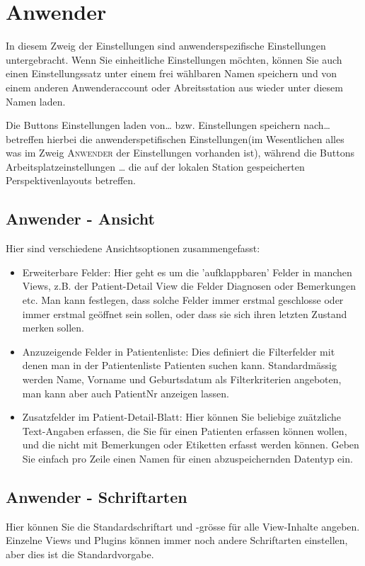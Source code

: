 \section{Anwender}
In diesem Zweig der Einstellungen sind anwenderspezifische Einstellungen
untergebracht. Wenn Sie einheitliche Einstellungen möchten, können Sie auch einen
Einstellungssatz unter einem frei wählbaren Namen speichern und von einem
anderen Anwenderaccount oder Abreitsstation aus wieder unter diesem Namen laden.

Die Buttons \glqq Einstellungen laden von\ldots\grqq{} bzw. \glqq Einstellungen
speichern nach\ldots\grqq{} betreffen hierbei die anwenderspetifischen
Einstellungen(im Wesentlichen alles was im Zweig \textsc{Anwender} der
Einstellungen vorhanden ist), während die Buttons \glqq
Arbeitsplatzeinstellungen \ldots\grqq{} die auf der lokalen Station
gespeicherten Perspektivenlayouts betreffen.
\subsection{Anwender - Ansicht}
\label{userconfig}
Hier sind verschiedene Ansichtsoptionen zusammengefasst:
\begin{itemize}
\item Erweiterbare Felder: Hier geht es um die 'aufklappbaren' Felder in manchen Views, z.B. der Patient-Detail View die Felder Diagnosen oder Bemerkungen etc. Man kann festlegen, dass solche Felder immer erstmal geschlosse oder immer erstmal geöffnet sein sollen, oder dass sie sich ihren letzten Zustand merken sollen.
\item Anzuzeigende Felder in Patientenliste: Dies definiert die Filterfelder mit denen man in der Patientenliste Patienten suchen kann. Standardmässig werden Name, Vorname und Geburtsdatum als Filterkriterien angeboten, man kann aber auch PatientNr anzeigen lassen.

\item Zusatzfelder im Patient-Detail-Blatt: Hier können Sie beliebige zuätzliche Text-Angaben erfassen, die Sie für einen Patienten erfassen können wollen, und die nicht mit Bemerkungen oder Etiketten erfasst werden können. Geben Sie einfach pro Zeile einen Namen für einen abzuspeichernden Datentyp ein.

\end{itemize}

\subsection{Anwender - Schriftarten}
Hier können Sie die Standardschriftart und -grösse für alle View-Inhalte angeben. Einzelne Views und Plugins können immer noch andere Schriftarten einstellen, aber dies ist die Standardvorgabe.

